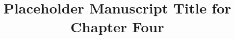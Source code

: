 \documentclass[../main.tex]{subfiles}
\title{Placeholder Manuscript Title for Chapter Four}
\affil{a}{Your Institute, Your Department, Your University, City, Country}
\begin{document}
\appendixfront






\end{document}
